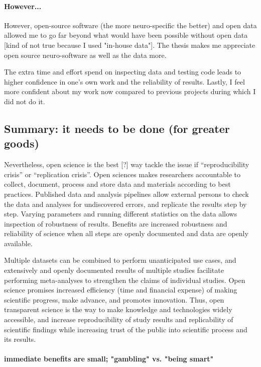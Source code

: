\paragraph{However...}

%
However, open-source software (the more neuro-specific the better) and open data
allowed me to go far beyond what would have been possible without open
data [kind of not true because I used "in-house data"].
%
The thesis makes me appreciate open source neuro-software as well as the data
more.

%
The extra time and effort spend on inspecting data and testing code
leads to higher confidence in one's own work and the reliability of results.
%
Lastly, I feel more confident about my work now compared to previous projects
during which I did not do it.



\subsection{Summary: it needs to be done (for greater goods)}
%
Nevertheless, open science is the best [?] way tackle the issue if
``reproducibility crisis'' or ``replication crisis''.
%
Open sciences makes researchers accountable to collect, document, process and
store data and materials according to best practices.
%
Published data and analysis pipelines allow external persons to check the data
and analyses for undiscovered errors, and replicate the results step by step.
%
Varying parameters and running different statistics on the data allows
inspection of robustness of results.
%
Benefits are increased robustness and reliability of science when all steps are
openly documented and data are openly available.

%
Multiple datasets can be combined to perform unanticipated use cases, and
extensively and openly documented results of multiple studies facilitate
performing meta-analyses to strengthen the claims of individual studies.
%
Open science promises increased efficiency (time and financial expense) of
making scientific progress, make advance, and promotes innovation.
%
Thus, open transparent science is the way to make knowledge and technologies
widely accessible, and increase reproducibility of study results and
replicability of scientific findings while increasing trust of the public into
scientific process and its results.


\paragraph{immediate benefits are small; "gambling" vs. "being smart"}

